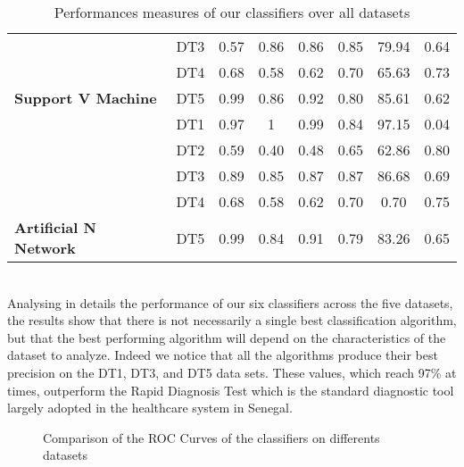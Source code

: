 \begin{table}[h]
\begin{tabular}{|l|c|c|c|c|c|c|c|}
  \cline{2-8}
  &DT3 &0.57 & 0.86&0.86&0.85&79.94&0.64\\
  \cline{2-8}
 & DT4 & 0.68&0.58&0.62&0.70&65.63&0.73\\
 \cline{2-8}
 \multirow{-4}{*}{ \textbf{Support V Machine}}& DT5 &0.99 &0.86&0.92&0.80&85.61&0.62\\
 \hline
\cline{2-8}
&DT1 &0.97&1 &0.99   &0.84 &97.15&0.04  \\
\cline{2-8}
&  DT2 &0.59  &0.40   &0.48&0.65&62.86&0.80 \\
\cline{2-8}
 & DT3 &0.89 &0.85 &0.87&0.87&86.68&0.69\\
 \cline{2-8}
 & DT4 &0.68 &0.58&0.62&0.70&0.70&0.75\\
  \cline{2-8}
  \multirow{-4}{*}{ \textbf{ Artificial N Network}}&DT5 &0.99 &0.84&0.91&0.79&83.26&0.65\\ 
  \hline
\end{tabular}
\caption{Performances measures of our classifiers over all datasets}\label{raw_data1}
\end{table}
\\
Analysing in details the performance of our six classifiers across the five datasets, the results show that there is not necessarily a single best classification algorithm, but that the best performing algorithm will depend on the characteristics of the dataset to analyze. Indeed we notice that all the algorithms produce their best precision on the DT1, DT3, and DT5 data sets. These values, which reach 97\% at times, outperform the Rapid Diagnosis Test which is the standard diagnostic tool largely adopted in the healthcare system in Senegal.
\begin{figure}[h]
\caption{Comparison of the ROC Curves of the classifiers on differents datasets}
\end{figure}
